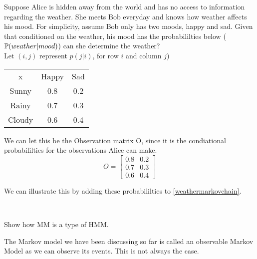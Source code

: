  \begin{example}
	 \label{motivationhmm}
	 Suppose Alice is hidden away from the world and has no access to information regarding the weather. She meets Bob everyday and knows how weather affects his mood.
	 For simplicity, assume Bob only has two moods, happy and sad. Given that conditioned on the weather, his mood has the probabililties below ($\mathbb{P} (weather | mood)$) can she determine the weather?
	\\
	Let $(i,j)$ represent $p(j|i)$, for row $i$ and column $j$) 
	 \begin{center}
		\begin{tabular}{c c c}
			x      & Happy & Sad \\
			Sunny  & 0.8   & 0.2 \\
			Rainy  & 0.7   & 0.3 \\ 
			Cloudy & 0.6   & 0.4
		\end{tabular}
	\end{center}

    We can let this be the Observation matrix O, since it is the condiational probabililties for the observations Alice can make.
	\begin{equation}
		O = 
		\begin{bmatrix}
		0.8 & 0.2 \\
		0.7 & 0.3 \\
		0.6 & 0.4 
		\end{bmatrix}
		\end{equation}
	
	We can illustrate this by adding these probabililties to \ref{weathermarkovchain}.

	\begin{center}
		\\
		\end{center}

\end{example}

\begin{example}
\label{}
\end{example}

Show how MM is a type of HMM.

The Markov model we have been discussing so far is called an observable Markov Model as we can observe its events. This is not always the case.